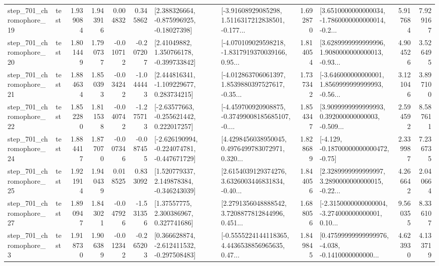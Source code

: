 \begin{tabular}{llrrrrllrlrr}
  step\_701\_chromophore\_19 &      test &      1.939084 &    1.943916 &      0.004832 &  0.345862 &    [2.388326664, -0.875996925, -0.18027398] &  [-3.91608929085298, 1.5116317212838501, -0.177... &       1.692870 &  [3.6510000000000034, -1.7860000000000014, -0.2... &            5.917684 &          7.929167 \\
  step\_701\_chromophore\_20 &      test &      1.801449 &    1.790737 &     -0.010712 & -0.207207 &     [2.41049882, 1.350766178, -0.399733842] &  [-4.070109029598218, -1.8317919370039166, 0.95... &       1.814054 &  [3.6289999999999996, 1.9080000000000013, -0.93... &            4.904526 &          3.526495 \\
  step\_701\_chromophore\_21 &      test &      1.884634 &    1.850393 &     -0.034242 & -1.044443 &    [2.444816341, -1.109229677, 0.283734215] &  [-4.012863706061397, 1.8539880397527617, -0.35... &       1.737342 &  [-3.646000000000001, 1.8569999999999993, -0.56... &            3.121046 &          3.897100 \\
  step\_701\_chromophore\_22 &      test &      1.852280 &    1.811538 &     -0.040742 & -1.275713 &    [-2.63577663, -0.255621442, 0.222017257] &  [-4.459700920908875, -0.37499008185685107, -0.... &       1.854347 &  [3.9099999999999993, 0.392000000000003, -0.509... &            2.594592 &          8.587611 \\
  step\_701\_chromophore\_24 &      test &      1.884417 &    1.877070 &     -0.007346 & -0.087455 &  [-2.626190994, -0.224074781, -0.447671729] &  [4.4298456038950045, 0.4976499783072971, 0.320... &       1.828689 &              [-4.129, -0.18700000000000472, -0.75] &            2.339987 &          7.236735 \\
  step\_701\_chromophore\_25 &      test &      1.921914 &    1.940439 &      0.018525 &  0.833092 &    [1.520779337, 2.149878384, -0.346243039] &  [2.6154039129374276, 3.6326003446831834, -0.40... &       1.844056 &  [2.3289999999999997, 3.2890000000000015, -0.22... &            4.266642 &          2.040664 \\
  step\_701\_chromophore\_27 &      test &      1.890947 &    1.843021 &     -0.047926 & -1.531356 &      [1.37557775, 2.300386967, 0.327741686] &  [2.2791356048888542, 3.7208877812844996, 0.451... &       1.688056 &  [-2.3150000000000004, -3.274000000000001, 0.10... &            9.560355 &          8.336107 \\
   step\_701\_chromophore\_3 &      test &      1.918730 &    1.906389 &     -0.012342 & -0.265203 &   [0.366628874, -2.612411532, -0.297508483] &  [-0.5555224144118365, 4.4436538856965635, 0.47... &       1.849845 &  [0.47599999999999976, -4.038, -0.1410000000000... &            4.623930 &          4.133719 \\

\end{tabular}
